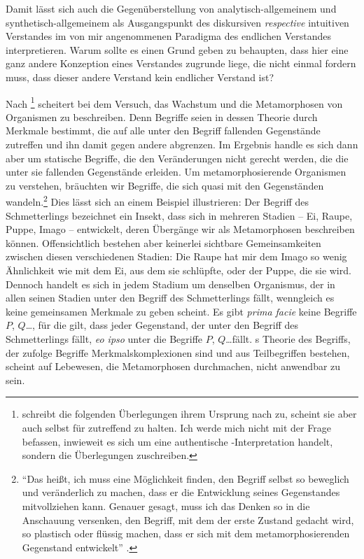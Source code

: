 Damit lässt sich auch die Gegenüberstellung von ana\-ly\-tisch-all\-ge\-mei\-nem
und syn\-the\-tisch-all\-ge\-mei\-nem als Ausgangspunkt des diskursiven
\emph{respective} intuitiven Verstandes im von mir angenommenen Paradigma des endlichen Verstandes
interpretieren. Warum sollte es einen Grund geben zu behaupten, dass hier eine
ganz andere Konzeption eines  Verstandes zugrunde liege, die
nicht einmal fordern muss, dass dieser andere Verstand kein endlicher Verstand
ist?

Nach \footnote{
schreibt die folgenden Überlegungen ihrem Ursprung nach  zu, scheint sie aber auch selbst für zutreffend zu halten. Ich
werde mich nicht mit der Frage befassen, inwieweit es sich um eine authentische
-Interpretation handelt, sondern
die Überlegungen  zuschreiben.} scheitert
 bei dem Versuch, das Wachstum und die Metamorphosen von
Organismen zu beschreiben. Denn Begriffe seien in dessen Theorie durch Merkmale
bestimmt, die auf alle unter den Begriff fallenden Gegenstände zutreffen und ihn
damit gegen andere abgrenzen. Im Ergebnis handle es sich dann aber um statische
Begriffe, die den Veränderungen nicht gerecht werden, die die unter sie
fallenden Gegenstände erleiden. Um metamorphosierende Organismen zu verstehen,
bräuchten wir Begriffe, die sich quasi mit den Gegenständen
wandeln.\footnote{\enquote{Das heißt, ich muss eine Möglichkeit finden, den
Begriff selbst so beweglich und veränderlich zu machen, dass er die Entwicklung
seines Gegenstandes mitvollziehen kann. Genauer gesagt, muss ich das Denken so
in die Anschauung versenken, den Begriff, mit dem der erste Zustand gedacht
wird, so plastisch oder flüssig machen, dass er sich mit dem metamorphosierenden
Gegenstand entwickelt}
\parencite[][183]{Foerster:DieBedeutungvonSS7677deremphKritikderUrteilskraftfuerdieEntwicklungdernachkantischenPhilosophieTeil12002}.}
Dies lässt sich an einem Beispiel illustrieren:
Der Begriff des Schmetterlings bezeichnet ein Insekt, dass sich in mehreren
Stadien -- Ei, Raupe, Puppe, Imago -- entwickelt, deren Übergänge wir als
Metamorphosen beschreiben können. Offensichtlich bestehen aber keinerlei
sichtbare Gemeinsamkeiten zwischen diesen verschiedenen Stadien: Die Raupe hat
mir dem Imago so wenig Ähnlichkeit wie mit dem Ei, aus dem sie schlüpfte, oder der
Puppe, die sie wird. Dennoch handelt es sich in jedem Stadium um denselben
Organismus, der in allen seinen Stadien unter den Begriff des Schmetterlings
fällt, wenngleich es keine gemeinsamen Merkmale zu geben scheint. Es gibt
\emph{prima facie} keine Begriffe $P$, $Q$\ldots , für die gilt, dass jeder
Gegenstand, der unter den Begriff des Schmetterlings fällt, \emph{eo ipso} unter
die Begriffe $P$, $Q$\ldots fällt. s Theorie des Begriffs, der zufolge Begriffe
Merkmalskomplexionen sind und aus Teilbegriffen bestehen, scheint auf Lebewesen,
die Metamorphosen durchmachen, nicht anwendbar zu sein.

